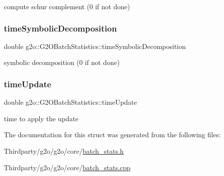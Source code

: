 compute schur complement (0 if not done) 

\mbox{\label{structg2o_1_1_g2_o_batch_statistics_a456a521ccb1e4c69940475a92a1f5d29}} 
\subsubsection{\texorpdfstring{time\+Symbolic\+Decomposition}{timeSymbolicDecomposition}}
{\footnotesize\ttfamily double g2o\+::\+G2\+O\+Batch\+Statistics\+::time\+Symbolic\+Decomposition}



symbolic decomposition (0 if not done) 

\mbox{\label{structg2o_1_1_g2_o_batch_statistics_a510e287e5a3e1f608219147b53e6dc69}} 
\subsubsection{\texorpdfstring{time\+Update}{timeUpdate}}
{\footnotesize\ttfamily double g2o\+::\+G2\+O\+Batch\+Statistics\+::time\+Update}



time to apply the update 



The documentation for this struct was generated from the following files\+:\begin{DoxyCompactItemize}
\item 
Thirdparty/g2o/g2o/core/\mbox{\hyperlink{batch__stats_8h}{batch\+\_\+stats.\+h}}\item 
Thirdparty/g2o/g2o/core/\mbox{\hyperlink{batch__stats_8cpp}{batch\+\_\+stats.\+cpp}}\end{DoxyCompactItemize}
